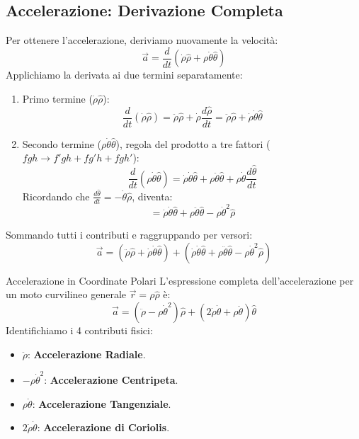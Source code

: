 \subsection{Accelerazione: Derivazione Completa}
Per ottenere l'accelerazione, deriviamo nuovamente la velocità:
\begin{equation}
    \vec{a} = \frac{d}{dt}(\dot{\rho}\hat{\rho} + \rho\dot{\theta}\hat{\theta})
\end{equation}
Applichiamo la derivata ai due termini separatamente:
\begin{enumerate}
    \item Primo termine ($\dot{\rho}\hat{\rho}$):
    \begin{equation}
    \frac{d}{dt}(\dot{\rho}\hat{\rho}) = \ddot{\rho}\hat{\rho} + \dot{\rho}\frac{d\hat{\rho}}{dt} = \ddot{\rho}\hat{\rho} + \dot{\rho}\dot{\theta}\hat{\theta}
\end{equation}
    \item Secondo termine ($\rho\dot{\theta}\hat{\theta}$), regola del prodotto a tre fattori ($fgh \to f'gh + fg'h + fgh'$):
    \begin{equation}
    \frac{d}{dt}(\rho\dot{\theta}\hat{\theta}) = \dot{\rho}\dot{\theta}\hat{\theta} + \rho\ddot{\theta}\hat{\theta} + \rho\dot{\theta}\frac{d\hat{\theta}}{dt}
\end{equation}
    Ricordando che $\frac{d\hat{\theta}}{dt} = -\dot{\theta}\hat{\rho}$, diventa:
    \begin{equation}
    = \dot{\rho}\dot{\theta}\hat{\theta} + \rho\ddot{\theta}\hat{\theta} - \rho\dot{\theta}^2\hat{\rho}
\end{equation}
\end{enumerate}

Sommando tutti i contributi e raggruppando per versori:
\begin{equation}
    \vec{a} = (\ddot{\rho}\hat{\rho} + \dot{\rho}\dot{\theta}\hat{\theta}) + (\dot{\rho}\dot{\theta}\hat{\theta} + \rho\ddot{\theta}\hat{\theta} - \rho\dot{\theta}^2\hat{\rho})
\end{equation}

\begin{teorema}{Accelerazione in Coordinate Polari}
L'espressione completa dell'accelerazione per un moto curvilineo generale $\vec{r} = \rho \hat{\rho}$ è:
\begin{equation}
    \vec{a} = (\ddot{\rho} - \rho \dot{\theta}^2)\hat{\rho} + (2\dot{\rho}\dot{\theta} + \rho \ddot{\theta}) \hat{\theta}
\end{equation}
Identifichiamo i 4 contributi fisici:
\begin{itemize}
    \item $\ddot{\rho}$: \textbf{Accelerazione Radiale}.
    \item $-\rho \dot{\theta}^2$: \textbf{Accelerazione Centripeta}.
    \item $\rho \ddot{\theta}$: \textbf{Accelerazione Tangenziale}.
    \item $2\dot{\rho}\dot{\theta}$: \textbf{Accelerazione di Coriolis}.
\end{itemize}
\end{teorema}
